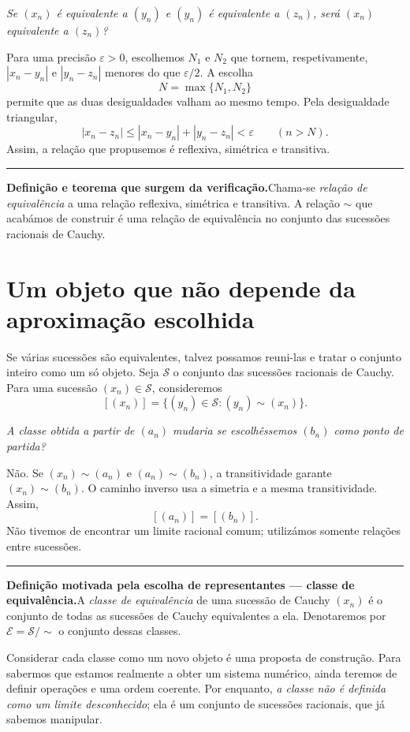 \documentclass[11pt,a4paper]{article}
\newcommand{\questao}[1]{\par\medskip\noindent\textit{#1}\par\smallskip}
\newcommand{\assentado}[2]{%
\par\medskip\noindent\begingroup\color{azul}\rule{\linewidth}{0.45pt}\par\smallskip
\noindent\textbf{#1.}\enspace #2\par\endgroup\medskip}
\begin{document}
\questao{Se $(x_n)$ é equivalente a $(y_n)$ e $(y_n)$ é equivalente a $(z_n)$, será $(x_n)$ equivalente a $(z_n)$?}

Para uma precisão $\varepsilon>0$, escolhemos $N_1$ e $N_2$ que tornem, respetivamente, $|x_n-y_n|$ e $|y_n-z_n|$ menores do que $\varepsilon/2$. A escolha
\[
 N=\max\{N_1,N_2\}
\]
permite que as duas desigualdades valham ao mesmo tempo. Pela desigualdade triangular,
\[
 |x_n-z_n|\le |x_n-y_n|+|y_n-z_n|<\varepsilon
 \qquad(n>N).
\]
Assim, a relação que propusemos é reflexiva, simétrica e transitiva.

\assentado{Definição e teorema que surgem da verificação}{Chama-se \emph{relação de equivalência} a uma relação reflexiva, simétrica e transitiva. A relação $\sim$ que acabámos de construir é uma relação de equivalência no conjunto das sucessões racionais de Cauchy.}

\section{Um objeto que não depende da aproximação escolhida}

Se várias sucessões são equivalentes, talvez possamos reuni-las e tratar o conjunto inteiro como um só objeto. Seja $\mathcal S$ o conjunto das sucessões racionais de Cauchy. Para uma sucessão $(x_n)\in\mathcal S$, consideremos
\[
 [(x_n)]=\{(y_n)\in\mathcal S:(y_n)\sim(x_n)\}.
\]

\questao{A classe obtida a partir de $(a_n)$ mudaria se escolhêssemos $(b_n)$ como ponto de partida?}

Não. Se $(x_n)\sim(a_n)$ e $(a_n)\sim(b_n)$, a transitividade garante $(x_n)\sim(b_n)$. O caminho inverso usa a simetria e a mesma transitividade. Assim,
\[
 \boxed{[(a_n)]=[(b_n)].}
\]
Não tivemos de encontrar um limite racional comum; utilizámos somente relações entre sucessões.

\assentado{Definição motivada pela escolha de representantes --- classe de equivalência}{A \emph{classe de equivalência} de uma sucessão de Cauchy $(x_n)$ é o conjunto de todas as sucessões de Cauchy equivalentes a ela. Denotaremos por $\mathcal E=\mathcal S/\!\sim$ o conjunto dessas classes.}

Considerar cada classe como um novo objeto é uma proposta de construção. Para sabermos que estamos realmente a obter um sistema numérico, ainda teremos de definir operações e uma ordem coerente. Por enquanto, \emph{a classe não é definida como um limite desconhecido}; ela é um conjunto de sucessões racionais, que já sabemos manipular.
\end{document}
